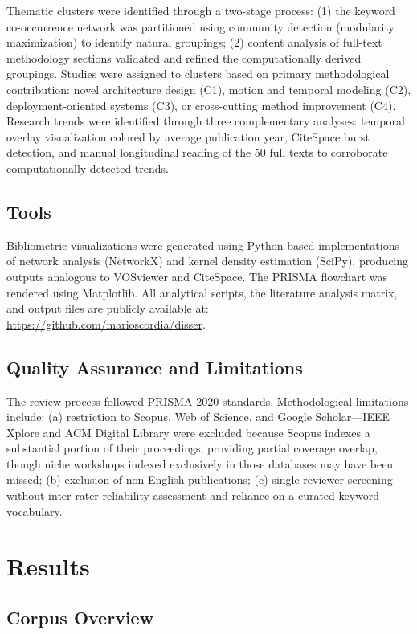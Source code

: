 \documentclass[conference]{IEEEtran}
\begin{document}
Thematic clusters were identified through a two-stage process: (1) the keyword co-occurrence network was partitioned using community detection (modularity maximization) to identify natural groupings; (2) content analysis of full-text methodology sections validated and refined the computationally derived groupings. Studies were assigned to clusters based on primary methodological contribution: novel architecture design (C1), motion and temporal modeling (C2), deployment-oriented systems (C3), or cross-cutting method improvement (C4). Research trends were identified through three complementary analyses: temporal overlay visualization colored by average publication year, CiteSpace burst detection, and manual longitudinal reading of the 50 full texts to corroborate computationally detected trends.

\subsection{Tools}

Bibliometric visualizations were generated using Python-based implementations of network analysis (NetworkX) and kernel density estimation (SciPy), producing outputs analogous to VOSviewer and CiteSpace. The PRISMA flowchart was rendered using Matplotlib. All analytical scripts, the literature analysis matrix, and output files are publicly available at: \url{https://github.com/marioscordia/disser}.

\subsection{Quality Assurance and Limitations}

The review process followed PRISMA 2020 standards. Methodological limitations include: (a) restriction to Scopus, Web of Science, and Google Scholar---IEEE Xplore and ACM Digital Library were excluded because Scopus indexes a substantial portion of their proceedings, providing partial coverage overlap, though niche workshops indexed exclusively in those databases may have been missed; (b) exclusion of non-English publications; (c) single-reviewer screening without inter-rater reliability assessment and reliance on a curated keyword vocabulary.

\section{Results}

\subsection{Corpus Overview}
\end{document}
